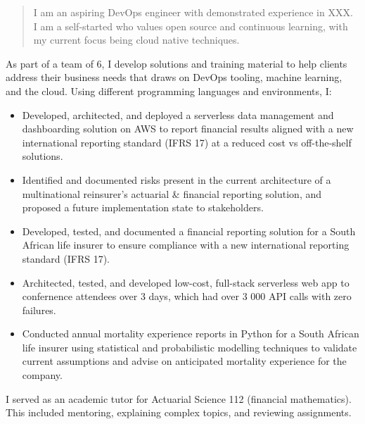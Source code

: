 \documentclass[10pt,a4paper,ragged2e,withhyper]{altacv}
\begin{document}
\begin{paracol}{2}
            \begin{quote}
                I am an aspiring DevOps engineer with demonstrated experience in XXX.\\

		I am a self-started who values open source and continuous learning, with my current focus being cloud native techniques.
            \end{quote}
        
	    As part of a team of 6, I develop solutions and training material to help clients address their business needs that draws on DevOps tooling, machine learning, and the cloud. Using different programming languages and environments, I:
            \begin{itemize} %
	      \item Developed, architected, and deployed a serverless data management and dashboarding solution on AWS to report financial results aligned with a new international reporting standard (IFRS 17) at a reduced cost vs off-the-shelf solutions.
	      \item Identified and documented risks present in the current architecture of a multinational reinsurer's actuarial \& financial reporting solution, and proposed a future implementation state to stakeholders.
	      \item Developed, tested, and documented a financial reporting solution for a South African life insurer to ensure compliance with a new international reporting standard (IFRS 17).
	      \item Architected, tested, and developed low-cost, full-stack serverless web app to confernence attendees over 3 days, which had over 3 000 API calls with zero failures.
	      \item Conducted annual mortality experience reports in Python for a South African life insurer using statistical and probabilistic modelling techniques to validate current assumptions and advise on anticipated mortality experience for the company.
            \end{itemize}
        
            \divider
	      I served as an academic tutor for Actuarial Science 112 (financial mathematics). This included mentoring, explaining complex topics, and reviewing assignments. 
            

\end{paracol}
\end{document}
